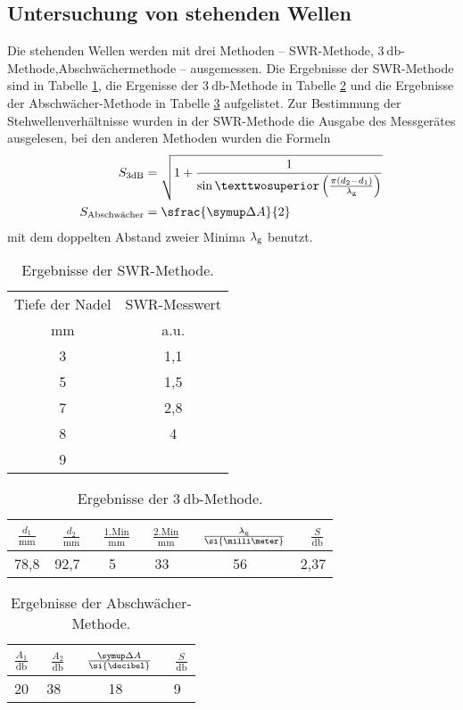 \subsection{Untersuchung von stehenden Wellen}
Die stehenden Wellen werden mit drei Methoden -- SWR-Methode, $\SI{3}{\decibel}$-Methode,Abschwächermethode -- ausgemessen. 
Die Ergebnisse der SWR-Methode sind in Tabelle \ref{tab:swr_methode}, die Ergenisse der $\SI{3}{\decibel}$-Methode in Tabelle \ref{tab:3dB} und die Ergebnisse der Abschwächer-Methode in Tabelle \ref{tab:Abschwaecher} aufgelistet.
Zur Bestimmung der Stehwellenverhältnisse wurden in der SWR-Methode die Ausgabe des Messgerätes ausgelesen, bei den anderen Methoden wurden die Formeln
\begin{align}
	S_\text{3dB}&=\sqrt{1+\frac{1}{\sin²\left(\frac{\pi(d_2-d_1)}{\lambda_\text g}\right)}}\\
	S_\text{Abschwächer}&=\sfrac{\symup\Delta A}{2}
\end{align}
mit dem doppelten Abstand zweier Minima $\lambda_\text g$ benutzt.
\begin{table}
\centering
\caption{Ergebnisse der SWR-Methode.}
\begin{tabular}{cc}
	\toprule
	Tiefe der Nadel& SWR-Messwert\\
	\si{\milli\meter}& a.u.\\
	\midrule
	3& 1,1\\
	5& 1,5\\
	7& 2,8\\
	8& 4\\
	9& \infty \\
	\bottomrule
\end{tabular}
\label{tab:swr_methode}
\end{table}
\begin{table}
\centering
\caption{Ergebnisse der $\SI{3}{\decibel}$-Methode.}
\begin{tabular}{cccccc}
	\toprule
	$\frac{d_1}{\si{\milli\meter}}$& \
	$\frac{d_2}{\si{\milli\meter}}$& \
	$\frac{\text{1.Min}}{\si{\milli\meter}}$& \
	$\frac{\text{2.Min}}{\si{\milli\meter}}$& \
	$\frac{\lambda_\text g}{\si{\milli\meter}}$& \
	$\frac{S}{\si{\decibel}}$\\
	\midrule
	78,8&	92,7&	5&	33& 56&	2,37\\
	\bottomrule
\end{tabular}
\label{tab:3dB}
\end{table}
\begin{table}
\centering
\caption{Ergebnisse der Abschwächer-Methode.}
\begin{tabular}{cccc}
	\toprule
	$\frac{A_1}{\si{\decibel}}$& \
	$\frac{A_2}{\si{\decibel}}$& \	
	$\frac{\symup\Delta A}{\si{\decibel}}$& \	
	$\frac{S}{\si{\decibel}}$\\
	\midrule
	20&	38&	18&	9\\
	\bottomrule
\end{tabular}
\label{tab:Abschwaecher}
\end{table}